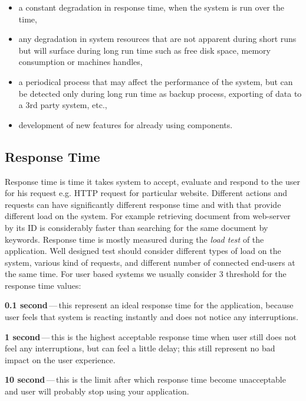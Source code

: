 \begin{itemize}
	\setlength\itemsep{0em}
	\item a constant degradation in response time, when the system is run over the time,
	\item any degradation in system resources that are not apparent during short runs but will surface during long run time such as free disk space, memory consumption or machines handles,
	\item a periodical process that may affect the performance of the system, but can be detected only during long run time as backup process, exporting of data to a 3rd party system, etc.,
	\item development of new features for already using components.
\end{itemize}


\subsection*{Response Time}
\label{Response Time 1}
Response time is time it takes system to accept, evaluate and respond to the user for his request e.g. HTTP request for particular website. Different actions and requests can have significantly different response time and with that provide different load on the system. For example retrieving document from web-server by its ID is considerably faster than searching for the same document by keywords. Response time is mostly measured during the \emph{load test} \cite{Manzor:APTB} of the application. Well designed test should consider different types of load on the system, various kind of requests, and different number of connected end-users at the same time. For user based systems we usually consider 3 threshold for the response time values: 

\begin{description}
	\setlength\itemsep{0em}
	\item \textbf{0.1 second}\,---\,this represent an ideal response time for the application, because user feels that system is reacting instantly and does not notice any interruptions.
	\item \textbf{1 second}\,---\,this is the highest acceptable response time when user still does not feel any interruptions, but can feel a little delay; this still represent no bad impact on the user experience.
	\item \textbf{10 second}\,---\,this is the limit after which response time become unacceptable and user will probably stop using your application.
\end{description}

